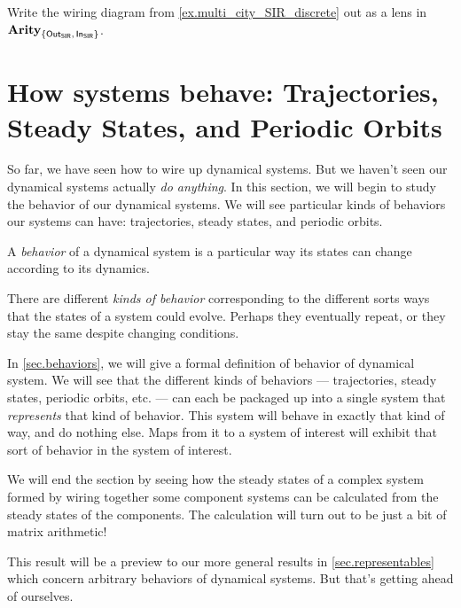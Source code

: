 \documentclass[DynamicalBook]{subfiles}
\begin{document}
\begin{exercise}

  
  Write the wiring diagram from \cref{ex.multi_city_SIR_discrete} out as a lens
  in $\textbf{Arity}_{\{\mathsf{Out}_{\mathsf{SIR}},\, \mathsf{In}_{\mathsf{SIR}} \}}$.
\end{exercise}

\section[How systems behave: Trajectories, Steady States, etc.]{How systems behave: Trajectories, Steady States, and Periodic Orbits}  \label{sec.behavior_discrete}

So far, we have seen how to wire up dynamical systems. But we haven't seen our
dynamical systems actually \emph{do anything}. In this section, we will begin to
study the behavior of our dynamical systems. We will see particular kinds of
behaviors our systems can have:
trajectories, steady states, and periodic orbits.

\begin{informal}
  A \emph{behavior} of a dynamical system is a particular way its states can
  change according to its dynamics.  

  There are different \emph{kinds of behavior} corresponding to the different
  sorts ways that the states of a system could evolve. Perhaps they eventually
  repeat, or they stay the same despite changing conditions.
\end{informal}

In \cref{sec.behaviors}, we will give a formal definition of behavior of
dynamical system. We will see that the different kinds of behaviors ---
trajectories, steady states, periodic orbits, etc. --- can each
be packaged up into a single system that \emph{represents} that kind of
behavior. This system will behave in exactly that kind of way, and do nothing else. Maps from it to a system of interest will exhibit that sort of behavior in the system of interest.

We will end the section by seeing how the steady states of a complex system formed by wiring together some
component systems can be calculated from the steady states of the components.
The calculation will turn out to be just a bit of matrix arithmetic!

This result will be a preview to our more general results in
\cref{sec.representables} which concern arbitrary behaviors of dynamical
systems. But that's
getting ahead of ourselves.
\end{document}
